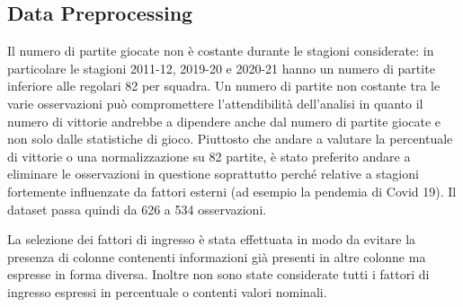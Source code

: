 \documentclass[11pt,a4paper]{article}
\begin{document}
\subsection{Data Preprocessing}
Il numero di partite giocate non è costante durante le stagioni considerate: in particolare le stagioni 2011-12, 2019-20 e 2020-21 hanno un numero di partite inferiore alle regolari 82 per squadra. 
Un numero di partite non costante tra le varie osservazioni può compromettere l'attendibilità dell'analisi in quanto il numero di vittorie andrebbe a dipendere anche dal numero di partite giocate e non solo dalle statistiche di gioco. 
Piuttosto che andare a valutare la percentuale di vittorie o una normalizzazione su 82 partite, è stato preferito andare a eliminare le osservazioni in questione soprattutto perché relative a stagioni fortemente influenzate da fattori esterni (ad esempio la pendemia di Covid 19). 
Il dataset passa quindi da 626 a 534 osservazioni.

La selezione dei fattori di ingresso è stata effettuata in modo da evitare la presenza di colonne contenenti informazioni già presenti in altre colonne ma espresse in forma diversa.
Inoltre non sono state considerate tutti i fattori di ingresso espressi in percentuale o contenti valori nominali.
\end{document}
